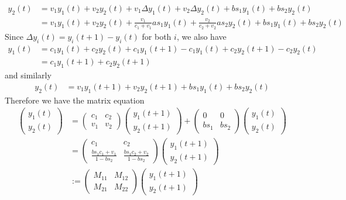 \documentclass{article}
\theoremstyle{definition}
\theoremstyle{plain}
\theoremstyle{theorem}
\begin{document}
\begin{align}
	y_2(t) &= v_1y_1(t) + v_2y_2(t) + v_1\Delta y_1(t) + v_2 \Delta y_2(t) + bs_1y_1(t) + bs_2y_2(t) \\
			&= v_1y_1(t) + v_2y_2(t) + \frac{v_1}{c_1+v_1}as_1y_1(t) + \frac{v_2}{c_2+v_2}as_2y_2(t) + bs_1y_1(t) + bs_2y_2(t)
\end{align}
Since $\Delta y_i(t) = y_i(t+1)-y_i(t)$ for both $i$, we also have
\begin{align}
	y_1(t) &= c_1y_1(t) + c_2y_2(t) + c_1y_1(t+1) - c_1y_1(t) + c_2y_2(t+1)-c_2y_2(t) \\
		&= c_1y_1(t+1) + c_2y_2(t+1)
\end{align}
and similarly
\begin{align}
	y_2(t) &= v_1y_1(t+1) + v_2y_2(t+1) + bs_1y_1(t) + bs_2y_2(t)
\end{align}
Therefore we have the matrix equation
\begin{align}
	\begin{pmatrix} y_1(t) \\ y_2(t) \end{pmatrix} &= \begin{pmatrix} c_1 & c_2 \\ v_1 & v_2 \end{pmatrix} \begin{pmatrix} y_1(t+1) \\ y_2(t+1) \end{pmatrix} + \begin{pmatrix} 0 & 0 \\ bs_1 & bs_2 \end{pmatrix} \begin{pmatrix} y_1(t) \\ y_2(t) \end{pmatrix} \\
	&= \begin{pmatrix} c_1 & c_2 \\ \frac{bs_1c_1 + v_1}{1-bs_2} & \frac{bs_1c_2 + v_2}{1-bs_2} \end{pmatrix}\begin{pmatrix} y_1(t+1) \\ y_2(t+1) \end{pmatrix} \\
	&:= \begin{pmatrix} M_{11} & M_{12} \\ M_{21} & M_{22} \end{pmatrix}\begin{pmatrix} y_1(t+1) \\ y_2(t+1) \end{pmatrix}
\end{align}
\end{document}
